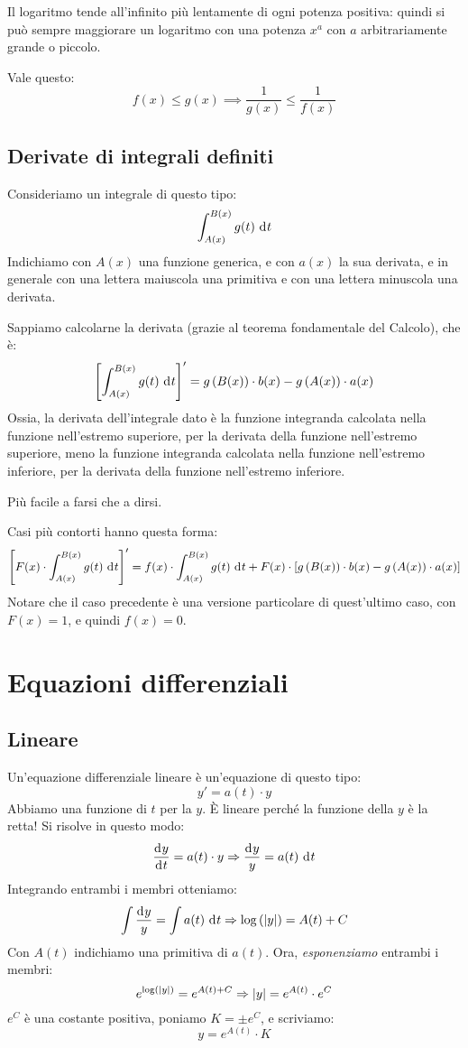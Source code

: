 Il logaritmo tende all'infinito pi\`u lentamente di ogni potenza positiva:
quindi si pu\`o sempre maggiorare un logaritmo con una potenza $x^a$ con 
$a$ arbitrariamente grande o piccolo.

Vale questo:
\[
f(x) \le g(x) \implies \frac{1}{g(x)} \le \frac{1}{f(x)}
\]

\section{Derivate di integrali definiti}

Consideriamo un integrale di questo tipo:
\[
\int_{A(x)}^{B(x)} g(t) \dx[t]
\]
Indichiamo con $A(x)$ una funzione generica, e con $a(x)$ la sua derivata,
e in generale con una lettera maiuscola una primitiva e con una lettera 
minuscola una derivata.

Sappiamo calcolarne la derivata (grazie al teorema fondamentale del Calcolo),
che \`e:
\[
\left[ \int_{A(x)}^{B(x)} g(t) \dx[t] \right]' =
g \left( B(x) \right) \cdot b(x) - g \left( A(x) \right) \cdot a(x)
\]
Ossia, la derivata dell'integrale dato \`e la funzione integranda calcolata
nella funzione nell'estremo superiore, per la derivata della funzione 
nell'estremo superiore, meno la funzione integranda calcolata nella funzione 
nell'estremo inferiore, per la derivata della funzione nell'estremo 
inferiore.

Pi\`u facile a farsi che a dirsi.
 
Casi pi\`u contorti hanno questa forma:
\[
\left[ F(x) \cdot \int_{A(x)}^{B(x)} g(t) \dx[t] \right]' =
f(x) \cdot \int_{A(x)}^{B(x)} g(t) \dx[t] +
F(x) \cdot \left[ g \left( B(x) \right) \cdot b(x) - g \left( A(x) \right) \cdot a(x) \right]
\]
Notare che il caso precedente \`e una versione particolare di 
quest'ultimo caso, con $F(x) = 1$, e quindi $f(x) = 0$.

\chapter{Equazioni differenziali}

\section{Lineare}

Un'equazione differenziale lineare \`e un'equazione di questo tipo:
\[
y' = a(t) \cdot y
\]
Abbiamo una funzione di $t$ per la $y$. \`E lineare perch\'e la funzione 
della $y$ \`e la retta! Si risolve in questo modo:
\[
\frac{\diff y}{\diff t} = a(t) \cdot y \implies
\frac{\diff y}{y} = a(t) \dx[t]
\]
Integrando entrambi i membri otteniamo:
\[
\int \frac{\diff y}{y} = \int a(t) \dx[t] \implies
\abslog{y} = A(t) + C
\]
Con $A(t)$ indichiamo una primitiva di $a(t)$. Ora, \emph{esponenziamo} 
entrambi i membri:
\[
e^{\log \left( \left\lvert{y}\right\rvert \right)} = e^{A(t) + C} \Rightarrow
\left\lvert{y}\right\rvert = e^{A(t)} \cdot e^C
\]
$e^C$ \`e una costante positiva, poniamo $K = \pm e^C$, e scriviamo:
\[
y = e^{A(t)} \cdot K
\]

